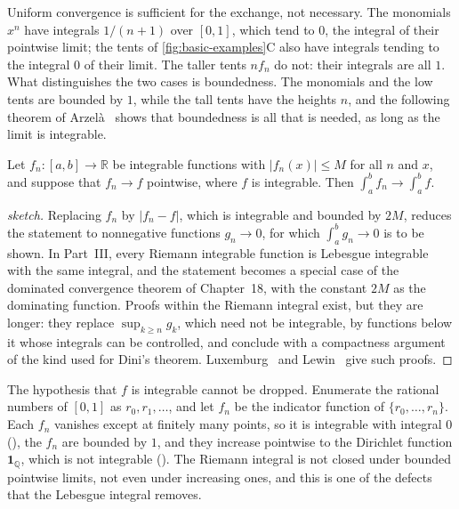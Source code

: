 Uniform convergence is sufficient for the exchange, not necessary. The monomials $x^n$ have integrals $1/(n+1)$ over $[0,1]$, which tend to $0$, the integral of their pointwise limit; the tents of \cref{fig:basic-examples}C also have integrals tending to the integral $0$ of their limit. The taller tents $nf_n$ do not: their integrals are all $1$. What distinguishes the two cases is boundedness. The monomials and the low tents are bounded by $1$, while the tall tents have the heights $n$, and the following theorem of Arzel\`a~\cite{arzela1885} shows that boundedness is all that is needed, as long as the limit is integrable.

\begin{theorem}
\label{thm:bounded-convergence}
Let $f_n\colon[a,b]\to\mathbb R$ be integrable functions with $|f_n(x)|\le M$ for all $n$ and $x$, and suppose that $f_n\to f$ pointwise, where $f$ is integrable. Then $\int_a^bf_n\to\int_a^bf$.
\end{theorem}

\begin{proof}[sketch]
Replacing $f_n$ by $|f_n-f|$, which is integrable and bounded by $2M$, reduces the statement to nonnegative functions $g_n\to0$, for which $\int_a^bg_n\to0$ is to be shown. In Part~III, every Riemann integrable function is Lebesgue integrable with the same integral, and the statement becomes a special case of the dominated convergence theorem of Chapter~18, with the constant $2M$ as the dominating function. Proofs within the Riemann integral exist, but they are longer: they replace $\sup_{k\ge n}g_k$, which need not be integrable, by functions below it whose integrals can be controlled, and conclude with a compactness argument of the kind used for Dini's theorem. Luxemburg~\cite{luxemburg1971} and Lewin~\cite{lewin1986} give such proofs.
\end{proof}

The hypothesis that $f$ is integrable cannot be dropped. Enumerate the rational numbers of $[0,1]$ as $r_0,r_1,\ldots$, and let $f_n$ be the indicator function of $\{r_0,\ldots,r_n\}$. Each $f_n$ vanishes except at finitely many points, so it is integrable with integral $0$ (), the $f_n$ are bounded by $1$, and they increase pointwise to the Dirichlet function $\mathbf 1_{\mathbb Q}$, which is not integrable (). The Riemann integral is not closed under bounded pointwise limits, not even under increasing ones, and this is one of the defects that the Lebesgue integral removes.

